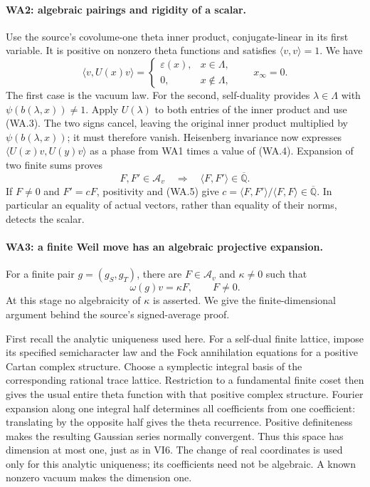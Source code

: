 \paragraph{WA2: algebraic pairings and rigidity of a scalar.}
Use the source's covolume-one theta inner product, conjugate-linear
in its first variable.  It is positive on nonzero theta functions
and satisfies $\langle v,v\rangle=1$.  We have
\[
 \langle v,U(x)v\rangle=
 \begin{cases}\varepsilon(x),&x\in\Lambda,\\0,&x\notin\Lambda,
 \end{cases}\qquad x_\infty=0.                              \tag{WA.4}
\]
The first case is the vacuum law.  For the second, self-duality
provides $\lambda\in\Lambda$ with $\psi(b(\lambda,x))\ne1$.
Apply $U(\lambda)$ to both entries of the inner product and use
(WA.3).  The two signs cancel, leaving the original inner product
multiplied by $\psi(b(\lambda,x))$; it must therefore vanish.
Heisenberg invariance now expresses
$\langle U(x)v,U(y)v\rangle$ as a phase from WA1 times a value
of (WA.4).  Expansion of two finite sums proves
\[
               F,F'\in\mathcal A_v
       \quad\Longrightarrow\quad
               \langle F,F'\rangle\in\overline{\mathbb Q}.
                                                               \tag{WA.5}
\]
If $F\ne0$ and $F'=cF$, positivity and (WA.5) give
$c=\langle F,F'\rangle/\langle F,F\rangle\in\overline{\mathbb Q}$.
In particular an equality of actual vectors, rather than equality
of their norms, detects the scalar.

\paragraph{WA3: a finite Weil move has an algebraic projective expansion.}
For a finite pair $g=(g_S,g_T)$, there are $F\in\mathcal A_v$ and
$\kappa\ne0$ such that
\[
                         \omega(g)v=\kappa F,
                              \qquad F\ne0.                \tag{WA.6}
\]
At this stage no algebraicity of $\kappa$ is asserted.  We give
the finite-dimensional argument behind the source's signed-average
proof.

First recall the analytic uniqueness used here.  For a self-dual
finite lattice, impose its specified semicharacter law and the
Fock annihilation equations for a positive Cartan complex structure.
Choose a symplectic integral basis of the corresponding rational
trace lattice.  Restriction to a fundamental finite coset then
gives the usual entire theta function with that positive complex
structure.  Fourier expansion along one integral half determines
all coefficients from one coefficient: translating by the opposite
half gives the theta recurrence.  Positive definiteness makes the
resulting Gaussian series normally convergent.  Thus this space has
dimension at most one, just as in VI6.  The change of real coordinates
is used only for this analytic uniqueness; its coefficients need
not be algebraic.  A known nonzero vacuum makes the dimension one.

